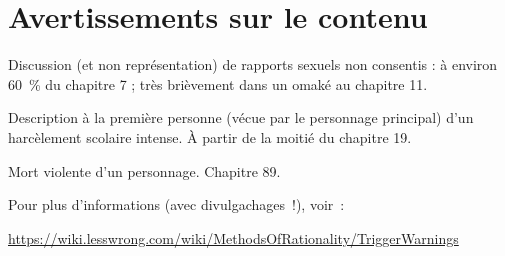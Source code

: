 \chapter*{Avertissements sur le contenu}
\thispagestyle{empty}

Discussion (et non représentation) de rapports sexuels non consentis : à environ 60~\% du chapitre 7 ; très brièvement dans un omaké au chapitre 11.

Description à la première personne (vécue par le personnage principal) d'un harcèlement scolaire intense. À partir de la moitié du chapitre 19.

Mort violente d'un personnage. Chapitre 89.

Pour plus d'informations (avec divulgachages~!), voir~:
\begin{center}\url{https://wiki.lesswrong.com/wiki/MethodsOfRationality/TriggerWarnings}\end{center}

